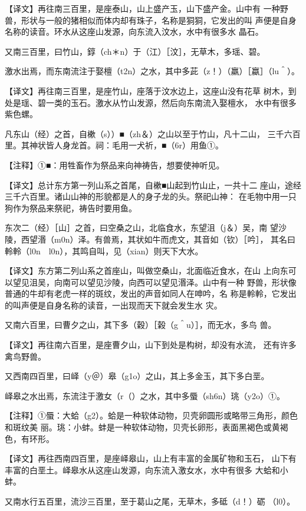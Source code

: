 \documentclass[a4paper,12pt,UTF8,twoside]{ctexbook}
\begin{document}
【译文】再往南三百里，是座泰山，山上盛产玉，山下盛产金。山中有 一种野兽，形状与一般的猪相似而体内却有珠子，名称是狪狪，它发出的叫 声便是自身名称的读音。环水从这座山发源，向东流入汶水，水中有很多水 晶石。

又南三百里，曰竹山，錞（ch＊n）于（江）［汶］，无草木，多瑶、碧。

激水出焉，而东南流注于娶檀（t2n）之水，其中多茈（z！）（羸）［蠃］（lu＾）。

【译文】再往南三百里，是座竹山，座落于汶水边上，这座山没有花草 树木，到处是瑶、碧一类的玉石。激水从竹山发源，然后向东南流入娶檀水， 水中有很多紫色螺。

凡东山（经）之首，自樕（s））■（zh＆）之山以至于竹山，凡十二山， 三千六百里。其神状皆人身龙首。祠：毛用一犬祈，■（6r）用鱼①。

【注释】①■：用牲畜作为祭品来向神祷告，想要使神听见。

【译文】总计东方第一列山系之首尾，自樕■山起到竹山止，一共十二 座山，途经三千六百里。诸山山神的形貌都是人的身子龙的头。祭祀山神： 在毛物中用一只狗作为祭品来祭祀，祷告时要用鱼。

东次二（经）［山］之首，曰空桑之山，北临食水，东望沮（j＆）吴，南 望沙陵，西望湣（m0n）泽。有兽焉，其状如牛而虎文，其音如（钦）［吟］， 其名曰軨軨（l0n　l0n），其鸣自叫，见（xian）则天下大水。

【译文】东方第二列山系之首座山，叫做空桑山，北面临近食水，在山 上向东可以望见沮吴，向南可以望见沙陵，向西可以望见湣泽。山中有一种 野兽，形状像普通的牛却有老虎一样的斑纹，发出的声音如同人在呻吟，名 称是軨軨，它发出的叫声便是自身名称的读音，一出现而天下就会发生水 灾。

又南六百里，曰曹夕之山，其下多（穀）［榖（g＾u）］，而无水，多鸟 兽。

【译文】再往南六百里，是座曹夕山，山下到处是构树，却没有水流， 还有许多禽鸟野兽。

又西南四百里，曰峄（y＠）皋（g1o）之山，其上多金玉，其下多白垩。

峄皋之水出焉，东流注于激女（r（）之水，其中多蜃（sh6n）珧（y2o）①。

【注释】①蜃：大蛤（g2）。蛤是一种软体动物，贝壳卵圆形或略带三角形，颜色和斑纹美 丽。珧：小蚌。蚌是一种软体动物，贝壳长卵形，表面黑褐色或黄褐色，有环形。

【译文】再往西南四百里，是座峄皋山，山上有丰富的金属矿物和玉石， 山下有丰富的白垩土。峄皋水从这座山发源，向东流入激女水，水中有很多 大蛤和小蚌。

又南水行五百里，流沙三百里，至于葛山之尾，无草木，多砥（d！）砺 （l0）。
\end{document}
